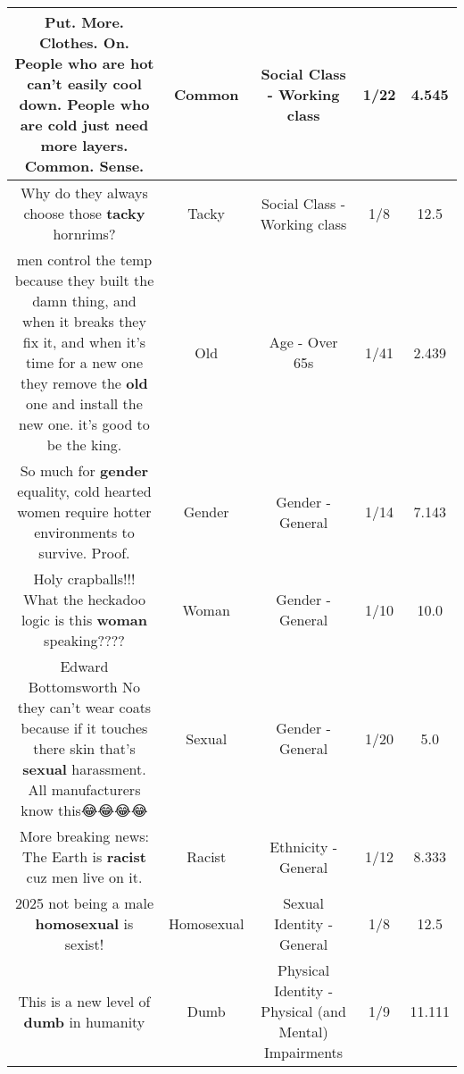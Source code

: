\documentclass[11pt]{article}
\newlength\mylength
\begin{document}
\begin{center}
\begin{longtable}{|C{.65\mylength}|C{.30\mylength}|C{.12\mylength}|C{.12\mylength}|C{.12\mylength}|}
  \small Put. More. Clothes. On. People who are hot can't easily cool down. People who are cold just need more layers. \textbf{Common}. Sense.\normalsize   & Common & Social Class - Working class & 1/22 & 4.545 \\  \hline
  \small Why do they always choose those \textbf{tacky} hornrims?\normalsize   & Tacky & Social Class - Working class & 1/8 & 12.5 \\  \hline
  \small men control the temp because they built the damn thing, and when it breaks they fix it, and when it's time for a new one they remove the \textbf{old} one and install the new one. it's good to be the king.\normalsize   & Old & Age - Over 65s & 1/41 & 2.439 \\  \hline
  \small So much for \textbf{gender} equality, cold hearted women require hotter environments to survive. Proof.\normalsize   & Gender & Gender - General & 1/14 & 7.143 \\  \hline
  \small Holy crapballs!!! What the heckadoo logic is this \textbf{woman} speaking????\normalsize   & Woman & Gender - General & 1/10 & 10.0 \\  \hline
  \small Edward Bottomsworth No they can't wear coats because if it touches there skin that's \textbf{sexual} harassment. All manufacturers know this😂😂😂😂\normalsize   & Sexual & Gender - General & 1/20 & 5.0 \\  \hline
  \small More breaking news: The Earth is \textbf{racist} cuz men live on it.\normalsize   & Racist & Ethnicity - General & 1/12 & 8.333 \\  \hline
  \small 2025 not being a male \textbf{homosexual} is sexist!\normalsize   & Homosexual & Sexual Identity - General & 1/8 & 12.5 \\  \hline
  \small This is a new level of \textbf{dumb} in humanity\normalsize   & Dumb & Physical Identity - Physical (and Mental) Impairments & 1/9 & 11.111 \\  \hline

\end{longtable}
\end{center}
\end{document}
